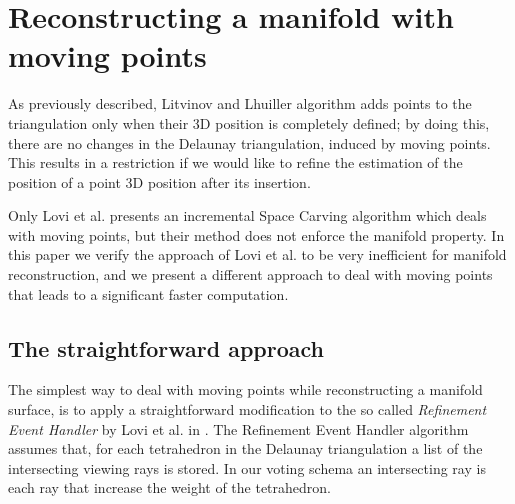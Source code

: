 % 

\section{Reconstructing a manifold with moving points}
\label{sec:3D-Reconstruction_2}
As previously described, Litvinov and Lhuiller \cite{litvinov_lhuillier_13} algorithm adds points to the triangulation only when their 3D position is completely defined; by doing this, there are no changes in the Delaunay triangulation, induced by moving points. This  results in a restriction if we would like to refine the estimation of the position of a point 3D position after its insertion.

Only Lovi et al. \cite{Lovi_et_al_11} presents an incremental Space Carving algorithm which deals with moving points, but their method does not enforce the manifold property.
In this paper we verify the approach of Lovi et al. \cite{Lovi_et_al_11} to be very inefficient for manifold reconstruction, and we present a different approach to deal with moving points that leads to a significant faster computation.


\subsection{The straightforward approach}
\label{subsec:straightforward_way}
The simplest way to deal with moving points while reconstructing a manifold surface, is to apply a straightforward modification to the so called \emph{Refinement Event Handler} by Lovi et al. in \cite{Lovi_et_al_11}.
The Refinement Event Handler algorithm assumes that, for each tetrahedron in the Delaunay triangulation a list of the intersecting viewing rays is stored. In our voting schema an intersecting ray is each ray that increase the weight of the tetrahedron. 

